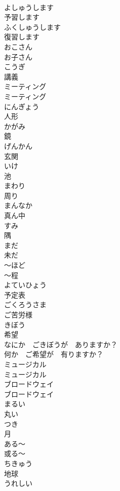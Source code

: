 \documentclass[8pt]{extreport}
\begin{document}
\begin{CJK}{UTF8}{min}
\\	よしゅうします	
\\	予習します		
\\	ふくしゅうします	
\\	復習します		
\\	おこさん	
\\	お子さん		
\\	こうぎ	
\\	講義		
\\	ミーティング	
\\	ミーティング		
\\	にんぎょう	
\\	人形		
\\	かがみ	
\\	鏡		
\\	げんかん	
\\	玄関		
\\	いけ	
\\	池		
\\	まわり	
\\	周り		
\\	まんなか	
\\	真ん中		
\\	すみ	
\\	隅		
\\	まだ	
\\	未だ		
\\	〜ほど	
\\	〜程		
\\	よていひょう	
\\	予定表		
\\	ごくろうさま	
\\	ご苦労様		
\\	きぼう	
\\	希望		
\\	なにか　ごきぼうが　ありますか？	
\\	何か　ご希望が　有りますか？		
\\	ミュージカル	
\\	ミュージカル		
\\	ブロードウェイ	
\\	ブロードウェイ		
\\	まるい	
\\	丸い		
\\	つき	
\\	月		
\\	ある〜	
\\	或る〜		
\\	ちきゅう	
\\	地球		
\\	うれしい	

\end{CJK}
\end{document}
